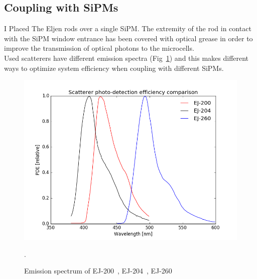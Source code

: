 \documentclass[10pt,a4paper, openany]{book}
\begin{document}


\subsection{Coupling with SiPMs}
I Placed The Eljen rods over a single SiPM. The extremity of the rod in contact with the SiPM window entrance has been covered with optical grease in order to improve the transmission of optical photons to the microcells.\\
Used scatterers have different emission spectra (Fig~\ref{fig:ejconf}) and this makes different ways to optimize system efficiency when coupling with different SiPMs. 


\begin{figure}[!h]
\begin{center}
\includegraphics[scale=0.48]{imm/ej_conf.png}
\end{center}
\caption{Emission spectrum of EJ-200~\cite{ej:3}, EJ-204~\cite{ej:204}, EJ-260~\cite{ej:260}}. 
\label{fig:ejconf}
\end{figure}
\end{document}
